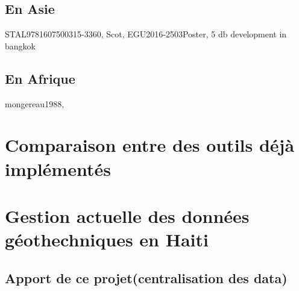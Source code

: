         \lipsum[1]
        \subsection{En Asie}
        STAL9781607500315-3360,
         Scot,
         EGU2016-2503Poster,
         5 db development in bangkok
    

        

        \subsection{En Afrique}
        mongereau1988,
    \section{Comparaison entre des outils déjà implémentés}
    \lipsum[1]
    \section{Gestion actuelle des données géothechniques en Haiti}
    \lipsum[1]
    \subsection{Apport de ce projet(centralisation des data)}
        \lipsum[1]
